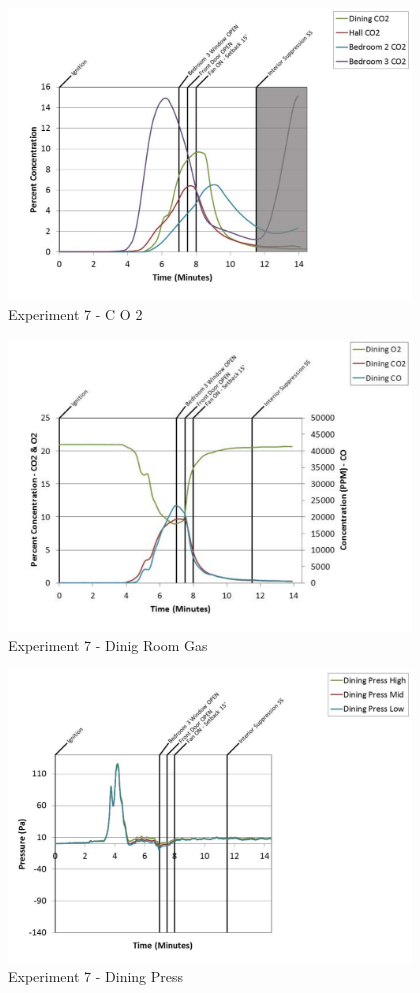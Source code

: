 \documentclass{article}
\begin{document}
\begin{appendices}
	\begin{figure}[h!]
		\centering
		\includegraphics[height=3.05in]{0_Images/Results_Charts/Exp_7_Charts/CO2.pdf}
		\caption{Experiment 7 - C O 2}
	\end{figure}
 
	\clearpage

	\begin{figure}[h!]
		\centering
		\includegraphics[height=3.05in]{0_Images/Results_Charts/Exp_7_Charts/DinigRoomGas.pdf}
		\caption{Experiment 7 - Dinig Room Gas}
	\end{figure}
 

	\begin{figure}[h!]
		\centering
		\includegraphics[height=3.05in]{0_Images/Results_Charts/Exp_7_Charts/DiningPress.pdf}
		\caption{Experiment 7 - Dining Press}
	\end{figure}
 

\end{appendices}
\end{document}
